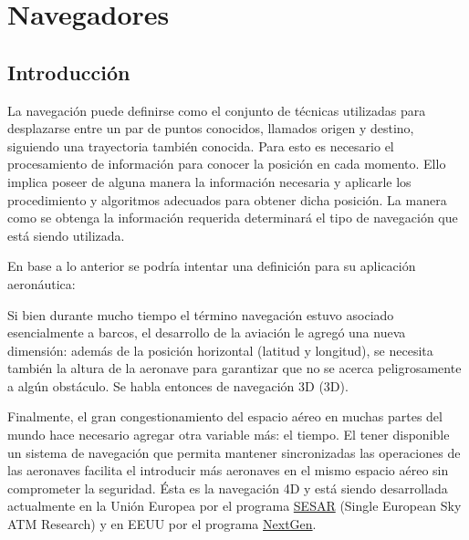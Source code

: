 %



\chapter{Navegadores}
\label{chap:U08.navegadores}

\section{Introducci\'on}
\label{sec:U08.introduccion}


La navegaci\'on puede definirse como el conjunto de t\'ecnicas utilizadas para desplazarse entre un par de puntos conocidos, llamados origen y destino, siguiendo una \gls{trayectoria} tambi\'en conocida. Para esto es necesario el procesamiento de informaci\'on para conocer la posici\'on en cada momento. Ello implica poseer de alguna manera la informaci\'on necesaria y aplicarle los procedimiento y algoritmos adecuados para obtener dicha posici\'on. La manera como se obtenga la informaci\'on requerida determinar\'a el tipo de navegaci\'on que est\'a siendo utilizada.

En base a lo anterior se podr\'ia intentar una definici\'on para su aplicaci\'on aeron\'autica:



Si bien durante mucho tiempo el t\'ermino navegaci\'on estuvo asociado esencialmente a barcos, el desarrollo de la aviaci\'on le agreg\'o una nueva dimensi\'on: adem\'as de la posici\'on horizontal (\Gls{latitud} y \Gls{longitud}), se necesita tambi\'en la altura de la aeronave para garantizar que no se acerca peligrosamente a alg\'un obst\'aculo. Se habla entonces de navegaci\'on 3D (\ac{3D}).

Finalmente, el gran congestionamiento del espacio a\'ereo en muchas partes del mundo hace necesario agregar otra variable m\'as: el tiempo. El tener disponible un sistema de navegaci\'on que permita mantener sincronizadas las operaciones de las aeronaves facilita el introducir m\'as aeronaves en el mismo espacio a\'ereo sin comprometer la seguridad. \'Esta es la navegaci\'on 4D y est\'a siendo desarrollada actualmente 
en la Unión Europea por el programa \href{https://www.sesarju.eu/}{SESAR} 
(Single European Sky ATM Research)
y en EEUU por el programa \href{https://www.faa.gov/nextgen/}{NextGen}.


